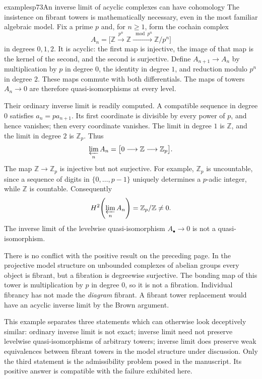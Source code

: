 \begin{enumerate}
\begin{dcomment}{examples}{p73}{An inverse limit of acyclic complexes can have cohomology}
The insistence on fibrant towers is mathematically necessary, even in the most familiar algebraic model. Fix a prime $p$ and, for $n\geq1$, form the cochain complex
\[
 A_n=\bigl[\mathbb Z\xrightarrow{p^n}\mathbb Z
                   \xrightarrow{\bmod p^n}\mathbb Z/p^n\bigr]
\]
in degrees $0,1,2$. It is acyclic: the first map is injective, the image of that map is the kernel of the second, and the second is surjective. Define $A_{n+1}\to A_n$ by multiplication by $p$ in degree $0$, the identity in degree $1$, and reduction modulo $p^n$ in degree $2$. These maps commute with both differentials. The maps of towers $A_n\to0$ are therefore quasi-isomorphisms at every level.

Their ordinary inverse limit is readily computed. A compatible sequence in degree $0$ satisfies $a_n=p a_{n+1}$. Its first coordinate is divisible by every power of $p$, and hence vanishes; then every coordinate vanishes. The limit in degree $1$ is $\mathbb Z$, and the limit in degree $2$ is $\mathbb Z_p$. Thus
\[
               \varprojlim_n A_n=\bigl[0\longrightarrow\mathbb Z
                                          \longrightarrow\mathbb Z_p\bigr].
\]
The map $\mathbb Z\to\mathbb Z_p$ is injective but not surjective. For example, $\mathbb Z_p$ is uncountable, since a sequence of digits in $\{0,\ldots,p-1\}$ uniquely determines a $p$-adic integer, while $\mathbb Z$ is countable. Consequently
\[
              H^2\!\left(\varprojlim_n A_n\right)=\mathbb Z_p/\mathbb Z\ne0.
\]
The inverse limit of the levelwise quasi-isomorphism $A_\bullet\to0$ is not a quasi-isomorphism.

There is no conflict with the positive result on the preceding page. In the projective model structure on unbounded complexes of abelian groups every object is fibrant, but a fibration is degreewise surjective. The bonding map of this tower is multiplication by $p$ in degree $0$, so it is not a fibration. Individual fibrancy has not made the \emph{diagram} fibrant. A fibrant tower replacement would have an acyclic inverse limit by the Brown argument.

This example separates three statements which can otherwise look deceptively similar: ordinary inverse limit is not exact; inverse limit need not preserve levelwise quasi-isomorphisms of arbitrary towers; inverse limit does preserve weak equivalences between fibrant towers in the model structure under discussion. Only the third statement is the admissibility problem posed in the manuscript. Its positive answer is compatible with the failure exhibited here.
\end{dcomment}



\end{enumerate}
